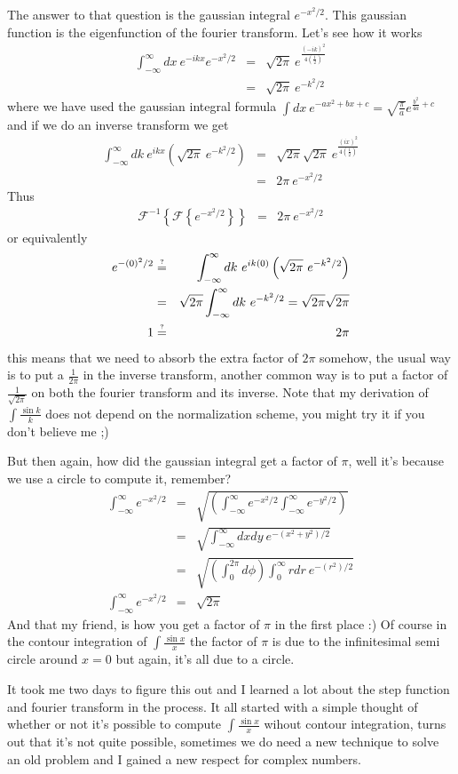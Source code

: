 \documentclass[aps,preprint,preprintnumbers,nofootinbib,showpacs,prd]{revtex4-1}
\newcommand{\msout}[1]{\text{\sout{\ensuremath{#1}}}}
\newcommand{\nbea}{\begin{eqnarray*}}
\newcommand{\neea}{\end{eqnarray*}}
\begin{document}
The answer to that question is the gaussian integral $e^{-x^2/2}$. This gaussian function is the eigenfunction of the fourier transform. Let's see how it works
%
\nbea
\int_{-\infty}^{\infty} dx~ e^{-ikx} e^{-x^2/2} & = & \sqrt{2 \pi} ~e^{\frac{(-ik)^2}{4\left( \frac{1}{2} \right)}} \\
& = & \sqrt{2 \pi} ~e^{-k^2/2}
\neea
%
where we have used the gaussian integral formula $\int dx~e^{-ax^2 + bx + c} = \sqrt{\frac{\pi}{a}} e^{\frac{b^2}{4a} + c}$ and if we do an inverse transform we get
%
\nbea
\int_{-\infty}^{\infty} dk~ e^{ikx} \left ( \sqrt{2 \pi} ~e^{-k^2/2} \right ) & = & \sqrt{2 \pi}\sqrt{2 \pi}~ e^{\frac{(ix)^2}{4\left( \frac{1}{2} \right)}} \\
& = & 2 \pi ~e^{-x^2/2}
\neea
%
Thus
%
\nbea
\mathcal{F}^{-1} \left \{ \mathcal{F} \left \{ e^{-x^2/2}\right \} \right \} & = & 2 \pi ~e^{-x^2/2}
\neea
%
or equivalently
%
\nbea
e^{-(0)^2/2} & \stackrel{\text{\tiny ?}}{=} & \int_{-\infty}^{\infty} dk~ e^{ik(0)} \left ( \sqrt{2 \pi} ~e^{-k^2/2} \right ) \\
& = & \sqrt{2 \pi} \int_{-\infty}^{\infty} dk~e^{-k^2/2} =  \sqrt{2 \pi} \sqrt{2 \pi} \\
1 & \stackrel{\text{\tiny ?}}{=} & 2 \pi
\neea
%
this means that we need to absorb the extra factor of $2 \pi$ somehow, the usual way is to put a $\frac{1}{2\pi}$ in the inverse transform, another common way is to put a factor of $\frac{1}{\sqrt{2 \pi}}$ on both the fourier transform and its inverse. Note that my derivation of $\int \frac{\sin k}{k}$ does not depend on the normalization scheme, you might try it if you don't believe me ;)

But then again, how did the gaussian integral get a factor of $\pi$, well it's because we use a circle to compute it, remember?
%
\nbea
\int_{-\infty}^{\infty} e^{-x^2/2} & = & \sqrt {\left ( \int_{-\infty}^{\infty} e^{-x^2/2} \int_{-\infty}^{\infty} e^{-y^2/2}\right ) } \\
& = & \sqrt { \int_{-\infty}^{\infty} dx dy ~ e^{-(x^2 + y^2)/2}} \\
& = & \sqrt { \left ( \int_0^{2\pi} d\phi \right )\int_{0}^{\infty} r dr  ~ e^{-(r^2)/2}} \\
\int_{-\infty}^{\infty} e^{-x^2/2} & = & \sqrt {2 \pi}
\neea
%
And that my friend, is how you get a factor of $\pi$ in the first place :) Of course in the contour integration of $\int \frac{\sin x}{x}$ the factor of $\pi$ is due to the infinitesimal semi circle around $x=0$ but again, it's all due to a circle.

It took me two days to figure this out and I learned a lot about the step function and fourier transform in the process. It all started with a simple thought of whether or not it's possible to compute $\int \frac{\sin x}{x}$ wihout contour integration, turns out that it's not quite possible, sometimes we do need a new technique to solve an old problem and I gained a new respect for complex numbers.



\end{document}
